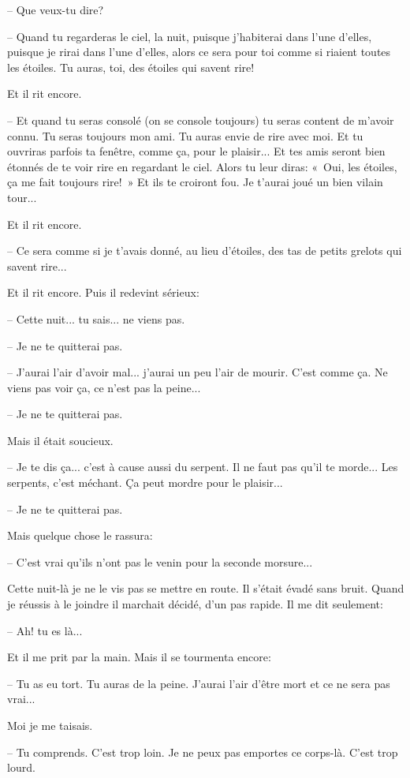 \documentclass[a4paper]{report}
\begin{document}
-- Que veux-tu dire?

-- Quand tu regarderas le ciel, la nuit, puisque j'habiterai dans l'une d'elles, puisque je rirai dans l'une d'elles, alors ce sera pour toi comme si riaient toutes les étoiles. Tu auras, toi, des étoiles qui savent rire!

Et il rit encore.

-- Et quand tu seras consolé (on se console toujours) tu seras content de m'avoir connu. Tu seras toujours mon ami. Tu auras envie de rire avec moi. Et tu ouvriras parfois ta fenêtre, comme ça, pour le plaisir... Et tes amis seront bien étonnés de te voir rire en regardant le ciel. Alors tu leur diras: «~Oui, les étoiles, ça me fait toujours rire!~» Et ils te croiront fou. Je t'aurai joué un bien vilain tour...

Et il rit encore.

-- Ce sera comme si je t'avais donné, au lieu d'étoiles, des tas de petits grelots qui savent rire...

Et il rit encore. Puis il redevint sérieux:

-- Cette nuit... tu sais... ne viens pas.

-- Je ne te quitterai pas.

-- J'aurai l'air d'avoir mal... j'aurai un peu l'air de mourir. C'est comme ça. Ne viens pas voir ça, ce n'est pas la peine...

-- Je ne te quitterai pas.

Mais il était soucieux.

-- Je te dis ça... c'est à cause aussi du serpent. Il ne faut pas qu'il te morde... Les serpents, c'est méchant. Ça peut mordre pour le plaisir...

-- Je ne te quitterai pas.

Mais quelque chose le rassura:

-- C'est vrai qu'ils n'ont pas le venin pour la seconde morsure...

Cette nuit-là je ne le vis pas se mettre en route. Il s'était évadé sans bruit. Quand je réussis à le joindre il marchait décidé, d'un pas rapide. Il me dit seulement:

-- Ah! tu es là...

Et il me prit par la main. Mais il se tourmenta encore:

-- Tu as eu tort. Tu auras de la peine. J'aurai l'air d'être mort et ce ne sera pas vrai...

Moi je me taisais.

-- Tu comprends. C'est trop loin. Je ne peux pas emportes ce corps-là. C'est trop lourd.
\end{document}

